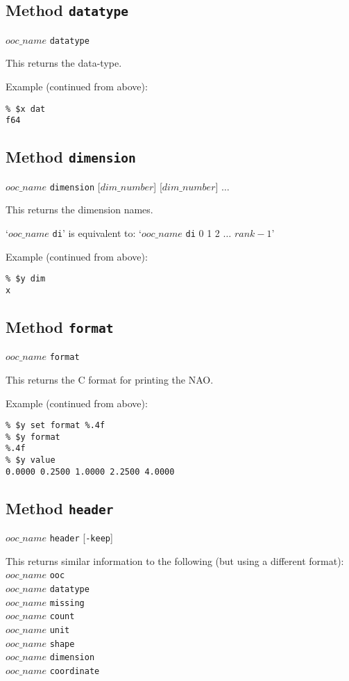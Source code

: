 \subsection{Method \texttt{datatype}}
    \label{ooc-meta-datatype}

  $ooc\_name$ \texttt{datatype}

This returns the data-type.
  
Example (continued from above):
  \begin{verbatim}
% $x dat
f64
\end{verbatim}

\subsection{Method \texttt{dimension}}
    \label{ooc-meta-dimension}

$ooc\_name$ \texttt{dimension} [$dim\_number$] [$dim\_number$] $\ldots$

This returns the dimension names.

  `$ooc\_name$ \texttt{di}'
  is equivalent to:
  `$ooc\_name$ \texttt{di} 0 1 2 $\ldots$ $rank-1$'

Example (continued from above):
  \begin{verbatim}
% $y dim
x
\end{verbatim}

\subsection{Method \texttt{format}}
    \label{ooc-meta-format}

  $ooc\_name$ \texttt{format}

This returns the C format for printing the NAO.
  
Example (continued from above):
  \begin{verbatim}
% $y set format %.4f
% $y format
%.4f
% $y value
0.0000 0.2500 1.0000 2.2500 4.0000
\end{verbatim}

\subsection{Method \texttt{header}}
    \label{ooc-meta-header}

$ooc\_name$ \texttt{header} [\texttt{-keep}]

This returns similar information to the following (but using a
  different format):
  \\
  $ooc\_name$ 
  \texttt{ooc}
  \\
  $ooc\_name$ 
  \texttt{datatype}
  \\
  $ooc\_name$ 
  \texttt{missing}
  \\
  $ooc\_name$ 
  \texttt{count}
  \\
  $ooc\_name$ 
  \texttt{unit}
  \\
  $ooc\_name$ 
  \texttt{shape}
  \\
  $ooc\_name$ 
  \texttt{dimension}
  \\
  $ooc\_name$ 
  \texttt{coordinate}


